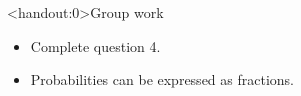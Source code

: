 \documentclass[xcolor=table]{beamer}
\begin{document}
\begin{frame}<handout:0>{Group work}
\begin{block}{}
\large
\begin{itemize}
\item Complete question 4.
\item Probabilities can be expressed as fractions.
\end{itemize}
\end{block}
\end{frame}
\end{document}

